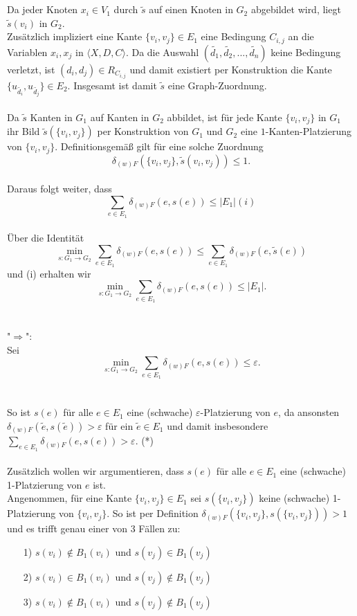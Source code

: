 \documentclass[a4paper, 12pt, twoside]{article}
\theoremstyle{Format1} %
\begin{document}
\\
\\
Da jeder Knoten $x_i \in V_1$ durch $\tilde{s}$ auf einen Knoten in $G_2$ abgebildet wird, liegt $\tilde{s}(v_i)$ in $G_2$.
\\
Zusätzlich impliziert eine Kante $\{v_i, v_j\} \in E_1$ eine Bedingung $C_{i,j}$ an die Variablen $x_i, x_j$ in $\langle X,D,C \rangle$.
Da die Auswahl $(\tilde{d_1},\tilde{d_2},...,\tilde{d_n})$ keine Bedingung verletzt, ist $(d_i,d_j) \in R_{C_{i,j}}$ und damit existiert per Konstruktion
die Kante $\{u_{\tilde{d_i}}, u_{\tilde{d_j}}\} \in E_2$. Insgesamt ist damit $\tilde{s}$ eine Graph-Zuordnung.
\\
\\
Da $\tilde{s}$ Kanten in $G_1$ auf Kanten in $G_2$ abbildet, ist für jede Kante $\{v_i, v_j\}$ in $G_1$ ihr Bild $\tilde{s}(\{v_i,v_j\})$ per Konstruktion
von $G_1$ und $G_2$ eine $1$-Kanten-Platzierung von $\{v_i, v_j\}$. Definitionsgemäß gilt für eine solche Zuordnung
$$\delta_{(w)F}(\{v_i,v_j\}, \tilde{s}({v_i,v_j})) \leq 1.$$
\\
Daraus folgt weiter, dass $$\sum_{e \in E_1} \delta_{(w)F}(e, s(e)) \leq |E_1| (i) $$
\\
Über die Identität $$\min_{s: G_1 \to G_2} \sum_{e \in E_1} \delta_{(w)F}(e, s(e)) \leq \sum_{e \in E_1} \delta_{(w)F}(e,\tilde{s}(e)) $$
und (i) erhalten wir
$$\min_{s: G_1 \to G_2} \sum_{e \in E_1} \delta_{(w)F}(e, s(e)) \leq |E_1|.$$
\\
\\
"$\Rightarrow$":
\\
Sei $$\min_{s: G_1 \to G_2} \sum_{e \in E_1} \delta_{(w)F}(e, s(e)) \leq {\varepsilon}.$$
\\
\\
So ist $s(e)$ für alle $e \in E_1$ eine (schwache) $\varepsilon$-Platzierung von $e$,
da ansonsten $\delta_{(w)F}(\tilde{e}, s(\tilde{e})) > \varepsilon$ für ein $\tilde{e} \in E_1$ und damit insbesondere $\sum_{{e}\in E_1} \delta_{(w)F}(e, s(e)) > \varepsilon$.
(*)
\\
\\
Zusätzlich wollen wir argumentieren, dass $s(e)$ für alle $e \in E_1$ eine (schwache) 1-Platzierung von $e$ ist.
\\
Angenommen, für eine Kante $\{v_i,v_j\} \in E_1$ sei $s(\{v_i, v_j\})$ keine (schwache) 1-Platzierung von $\{v_i,v_j\}$.
So ist per Definition $\delta_{(w)F}(\{v_i,v_j\}, s(\{v_i, v_j\})) > 1$
und es trifft genau einer von 3 Fällen zu:

\begin{enumerate}
	\item[1)] $s(v_i) \notin B_1(v_i)$ und $s(v_j) \in B_1(v_j)$
	\item[2)] $s(v_i) \in B_1(v_i)$ und $s(v_j) \notin B_1(v_j)$
	\item[3)] $s(v_i) \notin B_1(v_i)$ und $s(v_j) \notin B_1(v_j)$
\end{enumerate}
\end{document}
